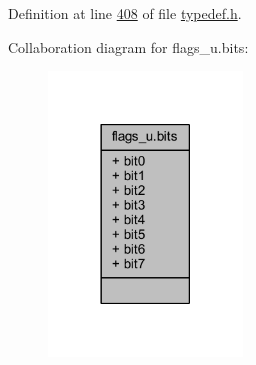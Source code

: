Definition at line \hyperlink{a00001_source_l00408}{408} of file \hyperlink{a00001_source}{typedef.\+h}.



Collaboration diagram for flags\+\_\+u.\+bits\+:
\nopagebreak
\begin{figure}[H]
\begin{center}
\leavevmode
\includegraphics[width=146pt]{db/d12/a00268}
\end{center}
\end{figure}
